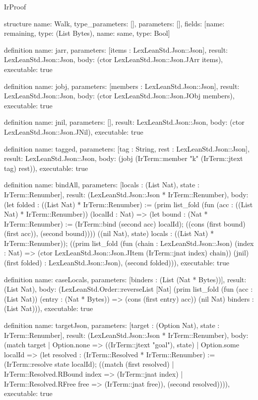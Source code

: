 \begin{lexlean}{IrProof}
\begin{semanticmodule}
structure{
  name: Walk,
  type_parameters: [],
  parameters: [],
  fields: [{name: remaining, type: (List Bytes)}, {name: same, type: Bool}]
}

definition{
  name: jarr,
  parameters: [items : LexLeanStd.Json::Json],
  result: LexLeanStd.Json::Json,
  body: (ctor LexLeanStd.Json::Json.JArr items),
  executable: true
}

definition{
  name: jobj,
  parameters: [members : LexLeanStd.Json::Json],
  result: LexLeanStd.Json::Json,
  body: (ctor LexLeanStd.Json::Json.JObj members),
  executable: true
}

definition{
  name: jnil,
  parameters: [],
  result: LexLeanStd.Json::Json,
  body: (ctor LexLeanStd.Json::Json.JNil),
  executable: true
}

definition{
  name: tagged,
  parameters: [tag : String, rest : LexLeanStd.Json::Json],
  result: LexLeanStd.Json::Json,
  body: (jobj (IrTerm::member "k" (IrTerm::jtext tag) rest)),
  executable: true
}

definition{
  name: bindAll,
  parameters: [locals : (List Nat), state : IrTerm::Renumber],
  result: (LexLeanStd.Json::Json * IrTerm::Renumber),
  body: (let folded : ((List Nat) * IrTerm::Renumber) := (prim list_fold (fun (acc : ((List Nat) * IrTerm::Renumber)) (localId : Nat) => (let bound : (Nat * IrTerm::Renumber) := (IrTerm::bind (second acc) localId); ((cons (first bound) (first acc)), (second bound)))) ((nil Nat), state) locals : ((List Nat) * IrTerm::Renumber)); ((prim list_fold (fun (chain : LexLeanStd.Json::Json) (index : Nat) => (ctor LexLeanStd.Json::Json.JItem (IrTerm::jnat index) chain)) (jnil) (first folded) : LexLeanStd.Json::Json), (second folded))),
  executable: true
}

definition{
  name: caseLocals,
  parameters: [binders : (List (Nat * Bytes))],
  result: (List Nat),
  body: (LexLeanStd.Order::reverseList [Nat] (prim list_fold (fun (acc : (List Nat)) (entry : (Nat * Bytes)) => (cons (first entry) acc)) (nil Nat) binders : (List Nat))),
  executable: true
}

definition{
  name: targetJson,
  parameters: [target : (Option Nat), state : IrTerm::Renumber],
  result: (LexLeanStd.Json::Json * IrTerm::Renumber),
  body: (match target
    | Option.none => ((IrTerm::jtext "goal"), state)
    | Option.some localId => (let resolved : (IrTerm::Resolved * IrTerm::Renumber) := (IrTerm::resolve state localId); ((match (first resolved)
      | IrTerm::Resolved.RBound index => (IrTerm::jnat index)
      | IrTerm::Resolved.RFree free => (IrTerm::jnat free)), (second resolved)))),
  executable: true
}


\end{semanticmodule}
\end{lexlean}

